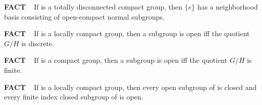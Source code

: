 \vspace{0.1cm}

\begin{x}{\small\bf FACT} \ %
If \mG is a totally disconnected compact group,  then $\{e\}$ has a neighborhood basis consisting of open-compact normal subgroups. 
\end{x}

\vspace{0.1cm}

\begin{x}{\small\bf FACT} \ %
If \mG is a locally compact group, then a subgroup \mH is open iff the quotient $G/H$ is discrete.
\end{x}

\vspace{0.1cm}

\begin{x}{\small\bf FACT} \ %
If \mG is a compact group, then a subgroup \mH is open iff the quotient $G/H$ is finite.
\end{x}

\vspace{0.1cm}

\begin{x}{\small\bf FACT} \ %
If \mG is a locally compact group, then every open subgroup of \mG is closed and every finite index closed subgroup of \mG is open.
\end{x}


















